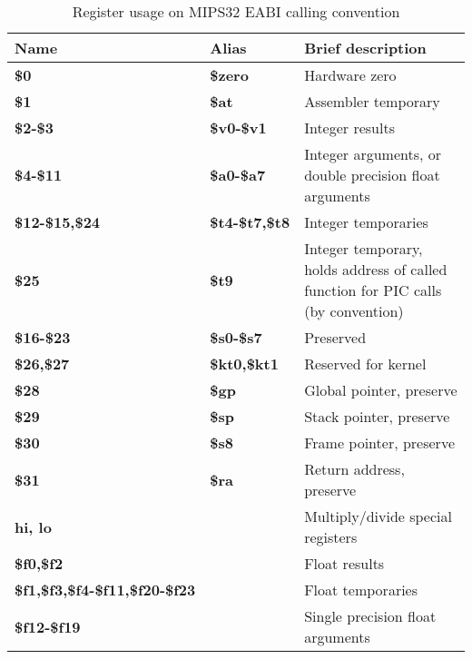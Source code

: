 \begin{table}[h]
\begin{tabular*}{0.95\textwidth}{lll}
Name                                   & Alias                & Brief description\\
\hline
{\bf \$0}                              & {\bf \$zero}         & Hardware zero \\
{\bf \$1}                              & {\bf \$at}           & Assembler temporary \\
{\bf \$2-\$3}                          & {\bf \$v0-\$v1}      & Integer results \\
{\bf \$4-\$11}                         & {\bf \$a0-\$a7}      & Integer arguments, or double precision float arguments\\
{\bf \$12-\$15,\$24}                   & {\bf \$t4-\$t7,\$t8} & Integer temporaries \\
{\bf \$25}                             & {\bf \$t9}           & Integer temporary, holds address of called function for PIC calls (by convention) \\
{\bf \$16-\$23}                        & {\bf \$s0-\$s7}      & Preserved \\
{\bf \$26,\$27}                        & {\bf \$kt0,\$kt1}    & Reserved for kernel \\
{\bf \$28}                             & {\bf \$gp}           & Global pointer, preserve \\
{\bf \$29}                             & {\bf \$sp}           & Stack pointer, preserve \\
{\bf \$30}                             & {\bf \$s8}           & Frame pointer, preserve \\
{\bf \$31}                             & {\bf \$ra}           & Return address, preserve \\
{\bf hi, lo}                           &                      & Multiply/divide special registers \\
{\bf \$f0,\$f2}                        &                      & Float results \\
{\bf \$f1,\$f3,\$f4-\$f11,\$f20-\$f23} &                      & Float temporaries \\
{\bf \$f12-\$f19}                      &                      & Single precision float arguments \\
\end{tabular*}
\caption{Register usage on MIPS32 EABI calling convention}
\end{table}

